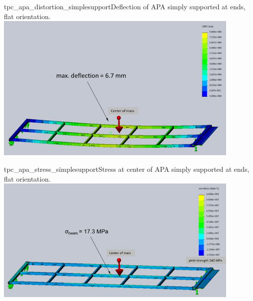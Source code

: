 \begin{cdrfigure}{tpc_apa_distortion_simplesupport}{Deflection of APA simply supported at ends, flat orientation.}
\includegraphics[width=0.9\textwidth]{figures/tpc_apa_distortion_simplesupport.png} 
\end{cdrfigure}

\begin{cdrfigure}{tpc_apa_stress_simplesupport}{Stress at center of APA simply supported at ends, flat orientation.}
\includegraphics[width=0.9\textwidth]{figures/tpc_apa_stress_simplesupport.png} 
\end{cdrfigure}

